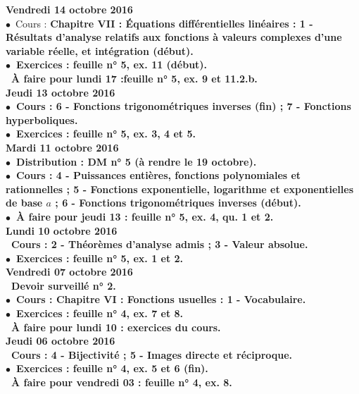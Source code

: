 \documentclass[12pt,a4paper]{article}
\begin{document}
\noindent\textbf{Vendredi 14 octobre 2016 }\\
$\bullet$\ Cours : \bf Chapitre VII \rm : Équations différentielles linéaires : 1 - Résultats d'analyse relatifs aux 
fonctions à valeurs complexes d'une variable réelle, et intégration (début).\\
$\bullet$\ Exercices : feuille n° 5, ex. 11 (début).\\
\bu\ À faire pour lundi 17 :feuille n° 5, ex. 9 et 11.2.b.\vspace{.4cm}\\

\noindent\textbf{Jeudi 13 octobre 2016 }\\
$\bullet$\ Cours :  6 - Fonctions trigonométriques inverses (fin) ; 7 - Fonctions hyperboliques.\\
$\bullet$\ Exercices : feuille n° 5, ex. 3, 4 et 5.\vspace{.4cm}\\

\noindent\textbf{\bf Mardi 11 octobre 2016 }\\
$\bullet$\ Distribution : DM n° 5 (à rendre le 19 octobre).\\
$\bullet$\ Cours : 4 - Puissances entières, fonctions 
polynomiales et rationnelles ; 5 - Fonctions exponentielle, logarithme et 
exponentielles de base $a$ ; 6 - Fonctions trigonométriques inverses (début).\\
$\bullet$\ À faire pour jeudi 13 : feuille n° 5, ex. 4, qu. 1 et 2.\vspace{.4cm}\\

\noindent\textbf{Lundi 10 octobre 2016 }\\
\bu\ Cours :  2 - Théorèmes d'analyse admis ; 3 - Valeur absolue.\\
$\bullet$\ Exercices : feuille n° 5, ex. 1 et 2.\vspace{.4cm}\\
   
\noindent\textbf{Vendredi 07 octobre 2016 }\\
\bu\ Devoir surveillé n° 2.\\
$\bullet$\ Cours : \bf Chapitre VI \rm : Fonctions usuelles : 1 - Vocabulaire.\\
$\bullet$\ Exercices : feuille n° 4, ex. 7 et 8.\\
\bu\ À faire pour lundi 10 : exercices du cours.\vspace{.4cm}\\

\noindent\textbf{Jeudi 06 octobre 2016 }\\
\bu\ Cours : 4 - Bijectivité ; 5 - Images directe et réciproque.\\
$\bullet$\ Exercices : feuille n° 4, ex. 5 et 6 (fin).\\
\bu\ À faire pour vendredi 03 : feuille n° 4, ex. 8.\vspace{.4cm}\\
\end{document}
